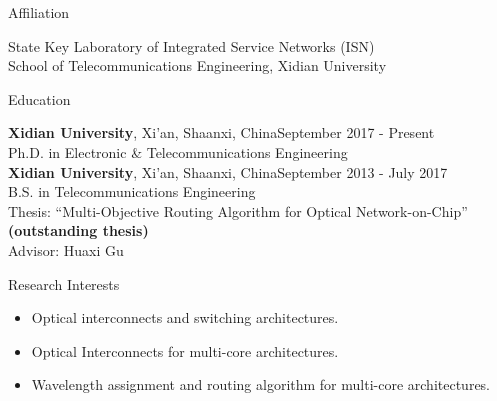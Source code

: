 \documentclass{resume} %
\begin{document}
\begin{rSection}{Affiliation}

State Key Laboratory of Integrated Service Networks (ISN)\\
School of Telecommunications Engineering, Xidian University

\end{rSection}


\begin{rSection}{Education}


{\bf Xidian University}, {Xi'an, Shaanxi, China}\hfill {September 2017 - Present} \\
Ph.D. in Electronic \& Telecommunications Engineering \\

{\bf Xidian University}, {Xi'an, Shaanxi, China}\hfill {September 2013 - July 2017} \\
B.S. in Telecommunications Engineering \\
Thesis: ``Multi-Objective Routing Algorithm for Optical Network-on-Chip” {\bf (outstanding thesis)}\\
Advisor: Huaxi Gu


\end{rSection}

\begin{rSection}{Research Interests}
\begin{itemize}
	\item Optical interconnects and switching architectures.
	\item Optical Interconnects for multi-core architectures.
	\item Wavelength assignment and routing algorithm for multi-core architectures.
\end{itemize}
\end{rSection}
\end{document}
